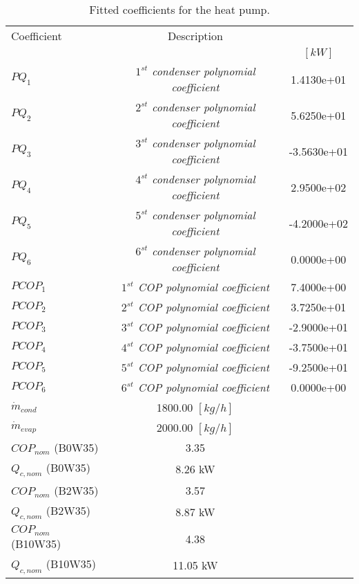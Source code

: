 \documentclass[english]{SPFShortReport}
\author{Dani Carbonell}
\begin{document}
\begin{table}[!ht]
\begin{small}
\caption{Fitted coefficients for the heat pump.}
\begin{center}
\resizebox{12cm}{!} 
{
\begin{tabular}{l | c c } 
\hline
\hline
Coefficient &Description & \\ 
 & &$[kW]$\\ 
\hline
$PQ_{1}$ & \emph{$1^{st}$ condenser polynomial coefficient}  & 1.4130e+01    \\ 
$PQ_{2}$ & \emph{$2^{st}$ condenser polynomial coefficient}  & 5.6250e+01    \\ 
$PQ_{3}$ & \emph{$3^{st}$ condenser polynomial coefficient}  & -3.5630e+01    \\ 
$PQ_{4}$ & \emph{$4^{st}$ condenser polynomial coefficient}  & 2.9500e+02    \\ 
$PQ_{5}$ & \emph{$5^{st}$ condenser polynomial coefficient}  & -4.2000e+02    \\ 
$PQ_{6}$ & \emph{$6^{st}$ condenser polynomial coefficient}  & 0.0000e+00    \\ 
\hline
$PCOP_{1}$ & \emph{$1^{st}$ COP polynomial coefficient}  & 7.4000e+00    \\ 
$PCOP_{2}$ & \emph{$2^{st}$ COP polynomial coefficient}  & 3.7250e+01    \\ 
$PCOP_{3}$ & \emph{$3^{st}$ COP polynomial coefficient}  & -2.9000e+01    \\ 
$PCOP_{4}$ & \emph{$4^{st}$ COP polynomial coefficient}  & -3.7500e+01    \\ 
$PCOP_{5}$ & \emph{$5^{st}$ COP polynomial coefficient}  & -9.2500e+01    \\ 
$PCOP_{6}$ & \emph{$6^{st}$ COP polynomial coefficient}  & 0.0000e+00    \\ 
\hline
$\dot m_{cond}$ & 1800.00 $[kg/h]$\\ 
$\dot m_{evap}$ & 2000.00 $[kg/h]$\\ 
\hline
$COP_{nom}$ (B0W35)& 3.35 \\ 
$Q_{c,nom}$ (B0W35)& 8.26 kW\\ 
$COP_{nom}$ (B2W35)& 3.57 \\ 
$Q_{c,nom}$ (B2W35)& 8.87 kW\\ 
$COP_{nom}$ (B10W35)& 4.38 \\ 
$Q_{c,nom}$ (B10W35)& 11.05 kW\\ 
\hline
\hline
\end{tabular}
}
\label{CoefTable}
\end{center}
\end{small}
\end{table}
\end{document}
